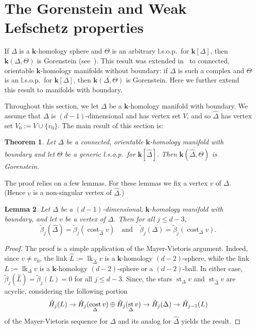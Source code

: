 \documentclass[10pt]{amsart}
\newtheorem{theorem}{Theorem}[section]
\newtheorem{lemma}[theorem]{Lemma}
\theoremstyle{definition}
\DeclareMathOperator\lk{lk}
\DeclareMathOperator\st{st}
\DeclareMathOperator\cost{cost}
\newcommand{\complet}[1]{\hat{#1}}
\newcommand{\field}{\mathbf{k}}
\begin{document}
\section{The Gorenstein and Weak Lefschetz properties} \label{sec:Gorenstein}
If $\Delta$ is a $\field$-homology sphere and $\Theta$ is an arbitrary l.s.o.p.~for $\field[\Delta]$, then $\field(\Delta,\Theta)$ is Gorenstein (see~\cite[Theorem~II.5.1]{Stanley-96}). This result was extended in~\cite[Theorem~1.4]{Novik-Swartz-09:Gorenstein} to connected, orientable $\field$-homology manifolds without boundary: if $\Delta$ is such a complex and $\Theta$ is an l.s.o.p.~for $\field[\Delta]$, then $\overline{\field(\Delta,\Theta)}$ is Gorenstein. Here we further extend this result to manifolds with boundary. 

Throughout this section, we let $\Delta$ be a $\field$-homology manifold with boundary. We assume that $\Delta$ is $(d-1)$-dimensional and has vertex set $V$, and so $\complet{\Delta}$ has vertex set $V_0:=V\cup\{v_0\}$. The main result of this section is:

\begin{theorem} \label{thm-Gorenstein}
Let $\Delta$ be a connected, orientable $\field$-homology manifold with boundary and let $\Theta$ be a generic l.s.o.p.~for $\field[\complet{\Delta}]$. Then $\overline{\field(\complet{\Delta},\Theta)}$ is Gorenstein.
\end{theorem}

The proof relies on a few lemmas. For these lemmas we fix a vertex $v$ of $\Delta$. (Hence $v$ is a non-singular vertex of $\complet{\Delta}$.)

\begin{lemma} \label{lem:homol-of-complex-and-costar}
Let $\Delta$ be a $(d-1)$-dimensional, $\field$-homology manifold with boundary, and let $v$ be a vertex of $\Delta$. Then for all $j\leq d-3$,
\[
\tilde{\beta}_j(\complet{\Delta})=\tilde{\beta}_j(\cost_{\complet{\Delta}}v) \quad \mbox{and} \quad \tilde{\beta}_j(\Delta)=\tilde{\beta}_j(\cost_{\Delta}v).
\]
\end{lemma}
\begin{proof}
The proof is a simple application of the Mayer-Vietoris argument. Indeed, since $v\neq v_0$, the link $\complet{L}:=\lk_{\complet{\Delta}}v$ is a $\field$-homology $(d-2)$-sphere, while the link $L:=\lk_\Delta v$ is a $\field$-homology $(d-2)$-sphere or a $(d-2)$-ball. In either case, $\tilde{\beta}_j(\complet{L})=\tilde{\beta}_j(L)=0$ for all $j\leq d-3$. Since, the stars $\st_\Delta v$ and $\st_{\complet{\Delta}}v$ are acyclic, considering the following portion 
\[
\postdisplaypenalty1000000
\tilde{H}_j(L)\to\tilde{H}_j(\cost_\Delta v)\oplus\tilde{H}_j(\st_\Delta v)\to\tilde{H}_j(\Delta)\to\tilde{H}_{j-1}(L)
\]
of the Mayer-Vietoris sequence for $\Delta$ and its analog for $\complet{\Delta}$ yields the result.
\end{proof}
\end{document}
